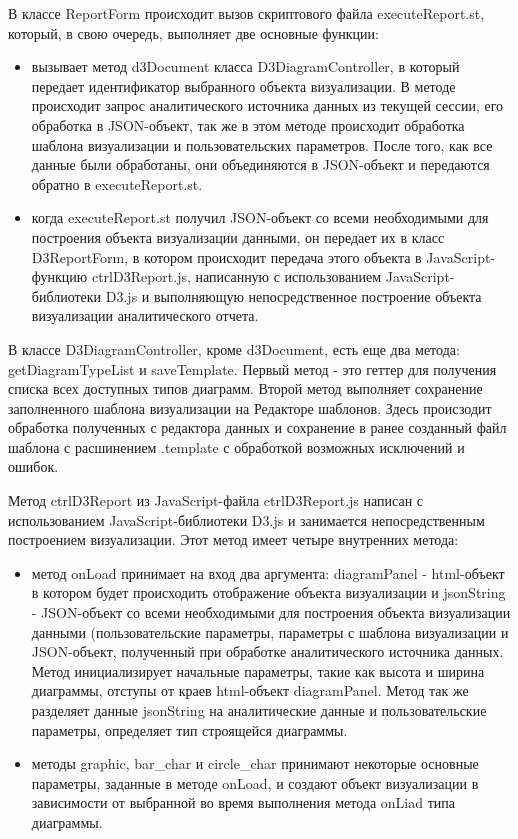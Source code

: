 \documentclass[a4paper]{extarticle}
\numberwithin{equation}{section}
\begin{document}
В классе ReportForm происходит вызов скриптового файла executeReport.st, который, в свою очередь, выполняет две основные функции:
\begin{itemize}
\item вызывает метод d3Document класса D3DiagramController, в который передает идентификатор выбранного объекта визуализации. В методе происходит запрос аналитического источника данных из текущей сессии, его обработка в JSON-объект, так же в этом методе происходит обработка шаблона визуализации и пользовательских параметров. После того, как все данные были обработаны, они объединяются в JSON-объект и передаются обратно в executeReport.st.
\item когда executeReport.st получил JSON-объект со всеми необходимыми для построения объекта визуализации данными, он передает их в класс D3ReportForm, в котором происходит передача этого объекта в JavaScript-функцию ctrlD3Report.js, написанную с использованием JavaScript-библиотеки D3.js и выполняющую непосредственное построение объекта визуализации аналитического отчета.
\end{itemize}
В классе D3DiagramController, кроме d3Document, есть еще два метода: getDiagramTypeList и saveTemplate. Первый метод - это геттер для получения списка всех доступных типов диаграмм. Второй метод выполняет сохранение заполненного шаблона визуализации на Редакторе шаблонов. Здесь происзодит обработка полученных с редактора данных и сохранение в ранее созданный файл шаблона с расшинением .template с обработкой возможных исключений и ошибок.\par
Метод ctrlD3Report из JavaScript-файла ctrlD3Report.js написан с использованием JavaScript-библиотеки D3.js и занимается непосредственным построением визуализации. Этот метод имеет четыре внутренних метода:
\begin{itemize}
\item метод onLoad принимает на вход два аргумента: diagramPanel - html-объект в котором будет происходить отображение объекта визуализации и jsonString - JSON-объект со всеми необходимыми для построения объекта визуализации данными (пользовательские параметры, параметры с шаблона визуализации и JSON-объект, полученный при обработке аналитического источника данных. Метод инициализирует начальные параметры, такие как высота и ширина диаграммы, отступы от краев html-объект diagramPanel. Метод так же разделяет данные jsonString на аналитические данные и пользовательские параметры, определяет тип строящейся диаграммы.
\item методы graphic, bar\_char и circle\_char принимают некоторые основные параметры, заданные в методе onLoad, и создают объект визуализации в зависимости от выбранной во время выполнения метода onLiad типа диаграммы.
\end{itemize}
\end{document}
